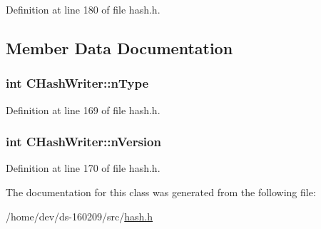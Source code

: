 Definition at line 180 of file hash.\+h.



\subsection{Member Data Documentation}
\hypertarget{class_c_hash_writer_ae8fe02b05db26a2647a7aeee035f022f}{}
\subsubsection[{n\+Type}]{\setlength{\rightskip}{0pt plus 5cm}int C\+Hash\+Writer\+::n\+Type}\label{class_c_hash_writer_ae8fe02b05db26a2647a7aeee035f022f}


Definition at line 169 of file hash.\+h.

\hypertarget{class_c_hash_writer_ad7d3642addab58385476dc0f9d55fa58}{}
\subsubsection[{n\+Version}]{\setlength{\rightskip}{0pt plus 5cm}int C\+Hash\+Writer\+::n\+Version}\label{class_c_hash_writer_ad7d3642addab58385476dc0f9d55fa58}


Definition at line 170 of file hash.\+h.



The documentation for this class was generated from the following file\+:\begin{DoxyCompactItemize}
\item 
/home/dev/ds-\/160209/src/\hyperlink{hash_8h}{hash.\+h}\end{DoxyCompactItemize}
